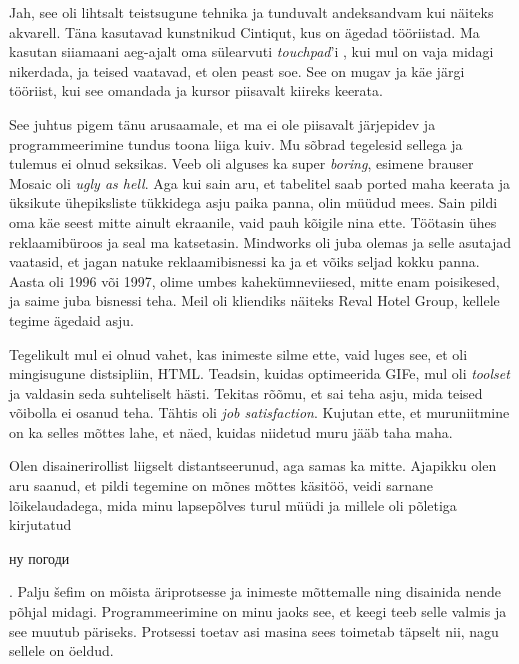 
Jah, see oli lihtsalt teistsugune tehnika ja tunduvalt andeksandvam 
kui näiteks akvarell. Täna kasutavad kunstnikud 
Cintiqut, kus on ägedad tööriistad. Ma kasutan siiamaani aeg-ajalt oma sülearvuti \emph{touchpad}'i , 
kui mul on vaja midagi nikerdada, ja teised
vaatavad, et olen peast soe. See on mugav ja käe järgi tööriist, kui see omandada ja kursor piisavalt kiireks keerata.

 
See juhtus pigem tänu arusaamale, et ma ei ole piisavalt 
järjepidev ja programmeerimine tundus toona liiga kuiv. Mu sõbrad 
tegelesid sellega ja tulemus ei olnud seksikas. Veeb oli alguses ka super 
\emph{boring}, esimene brauser Mosaic oli \emph{ugly 
as hell}. Aga kui sain aru, et tabelitel saab ported maha keerata ja 
üksikute ühepiksliste tükkidega asju paika panna, 
olin müüdud mees. Sain pildi oma käe seest mitte ainult
ekraanile, vaid pauh kõigile nina ette. 
Töötasin ühes reklaamibüroos ja seal ma katsetasin. 
Mindworks oli juba olemas ja selle asutajad vaatasid, et jagan natuke reklaamibisnessi ka ja et võiks seljad kokku panna. Aasta 
oli 1996 või 1997, olime umbes kahekümneviiesed, mitte enam
poisikesed, ja saime juba bisnessi teha.
Meil oli kliendiks näiteks Reval Hotel Group, kellele tegime ägedaid asju.


Tegelikult mul ei olnud vahet, kas inimeste silme ette, vaid luges
see, et oli mingisugune distsipliin, HTML. Teadsin, kuidas 
optimeerida GIFe, mul oli \emph{toolset} ja valdasin seda 
suhteliselt hästi. Tekitas rõõmu, et sai teha asju, mida 
teised võibolla ei osanud teha. Tähtis oli \emph{job satisfaction}. Kujutan ette, et muruniitmine on ka selles mõttes lahe, et näed, kuidas 
niidetud muru jääb taha maha.


Olen disainerirollist liigselt distantseerunud, aga samas ka
mitte. Ajapikku olen aru saanud, et pildi tegemine on mõnes mõttes 
käsitöö, veidi sarnane lõikelaudadega, mida minu lapsepõlves 
turul müüdi ja millele oli põletiga kirjutatud \begin{russian}ну погоди\end{russian}. Palju šefim on mõista
äriprotsesse ja inimeste mõttemalle ning 
disainida nende põhjal midagi. Programmeerimine on minu jaoks see, et keegi teeb selle valmis ja see muutub 
päriseks. Protsessi toetav asi masina sees toimetab täpselt nii, nagu 
sellele on öeldud. 

